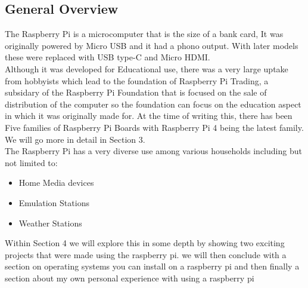 \documentclass{article}
\begin{document}
	\subsection{General Overview}
	The Raspberry Pi is a microcomputer that is the size of a bank card, It was originally powered by Micro USB and it had a phono output. With later models these were replaced with USB type-C and Micro HDMI. \citep{rpi}\\Although it was developed for Educational use, there was a very large uptake from hobbyists which lead to the foundation of Raspberry Pi Trading, a subsidary of the Raspberry Pi Foundation that is focused on the sale of distribution of the computer so the foundation can focus on the education aspect in which it was originally made for. At the time of writing this, there has been Five families of Raspberry Pi Boards with Raspberry Pi 4 being the latest family. We will go more in detail in Section 3. \\The Raspberry Pi has a very diverse use among various households including but not limited to:
	\begin{itemize}
		\item Home Media devices
		\item Emulation Stations
		\item Weather Stations
	\end{itemize}
	Within Section 4 we will explore this in some depth by showing two exciting projects that were made using the raspberry pi. we will then conclude with a section on operating systems you can install on a raspberry pi and then finally a section about my own personal experience with using a raspberry pi
	\newpage
\end{document}
